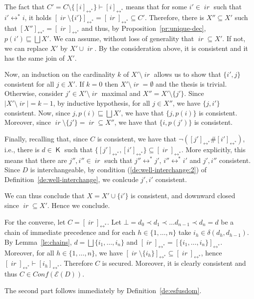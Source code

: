 \documentclass[conference]{IEEEtran}
\renewenvironment{proof}{\begin{IEEEproof}}{\end{IEEEproof}}
\newcommand{\wi}{{interchangeable}}
\newcommand{\compact}[1]{\ensuremath{\mathop{\mathsf{K}({#1})}}}
\newcommand{\ir}[1]{\ensuremath{\mathop{\mathit{ir}({#1})}}}
\newcommand{\diff}[2]{\ensuremath{\delta({#1},{#2})}}
\newcommand{\pred}[1]{\ensuremath{\mathit{p}({#1})}}
\newcommand{\eqclass}[2][]{\ensuremath{[{#2}]_{\scriptscriptstyle {#1}}}}
\newcommand{\eqclassir}[1]{\ensuremath{\eqclass[\leftrightarrow^*]{#1}}}
\newcommand{\zev}[0]{\ensuremath{\mathcal{E}}}
\newcommand{\ev}[1]{\ensuremath{\zev({#1})}}
\newcommand{\conf}[1]{\ensuremath{\mathit{Conf}({#1})}}
\begin{document}
\begin{proof}
\begin{itemize}
    The fact that
    $C' = C \setminus \{ \eqclassir{i} \} \vdash \eqclassir{i}$ means
    that for some $i' \in \ir{D}$ such that $i' \leftrightarrow^* i$, it holds
    $\eqclassir{\ir{i'} \setminus \{i'\}} = \eqclassir{\ir{\pred{i'}}}
    \subseteq C'$.
    Therefore, there is $X'' \subseteq X'$ such that
    $\eqclassir{X''} = \eqclassir{\ir{\pred{i}}}$ and thus, by
    Proposition~\ref{pr:unique-dec},
    $\pred{i'} \sqsubseteq \bigsqcup X'$.
    We can assume, without loss of generality that
    $\ir{\pred{i'}} \subseteq X'$. If not, we can replace $X'$ by
    $X' \cup \ir{\pred{i'}}$. By the consideration above, it is
    consistent and it has the same join of $X'$.

    Now, an induction on the cardinality $k$ of
    $X' \setminus \ir{\pred{i'}}$ allows us to show that $\{i', j\}$
    consistent for all $j \in X'$. If $k=0$ then
    $X' \setminus \ir{\pred{i'}} =\emptyset$ and the thesis is
    trivial. Otherwise, consider $j' \in X' \setminus \ir{\pred{i'}}$
    maximal and $X'' = X' \setminus \{j'\}$. Since
    $|X' \setminus \ir{\pred{i'}}|=k-1$, by inductive hypothesis, for
    all $j \in X''$, we have $\{j,i'\}$ consistent. Now, since
    $j, \pred{i} \sqsubseteq \bigsqcup X'$, we have that
    $\{j, \pred{i}\}$ is consistent. Moreover, since
    $\ir{j'} \setminus\{j'\} = \ir{\pred{j'}} \subseteq X''$, we have
    that $\{i, \pred{j'}\}$ is consistent. 

    Finally, recalling that, since $C$ is
    consistent, we have that
    $\neg (\eqclassir{j'} \# \eqclassir{i'})$, i.e., there is
    $d \in \compact{D}$ such that
    $\{ \eqclassir{j'}, \eqclassir{i'} \} \subseteq
    \eqclassir{\ir{d}}$. More explicitly, this means that there are
    $j'', i'' \in \ir{D}$ such that $j'' \leftrightarrow^* j'$,
    $i'' \leftrightarrow^* i'$ and $j', i''$ consistent.
    Since $D$ is {\wi}, by condition (\ref{de:well-interchange:2}) of
    Definition~\ref{de:well-interchange}, we conlcude $j', i'$
    consistent.


    We can thus conclude that $X = X' \cup \{ i' \}$ is consistent,
    and downward closed since
    $\ir{\pred{i'}} \subseteq X'$. Hence we conclude.
  \end{itemize}

  \bigskip

  For the converse, let $C = \eqclassir{\ir{d}}$. Let
  $\bot = d_0 \prec d_1 \prec \ldots d_{n-1} \prec d_n = d$ be a chain
  of immediate precedence and for each $h \in \{1, \ldots, n\}$ take
  $i_h \in \diff{d_h}{d_{h-1}}$. By Lemma~\ref{le:chains},
  $d = \bigsqcup \{ i_1, \ldots, i_n\}$ and
  $\eqclassir{\ir{d}} = \eqclassir{\{ i_1, \ldots, i_n\}}$. Moreover,
  for all $h \in \{1, \ldots, n\}$, we have
  $\eqclassir{\ir{i_h} \setminus \{ i_h \}} \subseteq
  \eqclassir{\ir{d_{h-1}}}$, hence
  $\eqclassir{\ir{d_{h-1}}} \vdash \eqclassir{i_h}$. Therefore $C$ is
  secured. Moreover, it is clearly consistent and thus
  $C \in \conf{\ev{D}}$.


  \bigskip

  The second part follows immediately by Definition~\ref{de:esfusdom}.
\end{proof}
\end{document}
